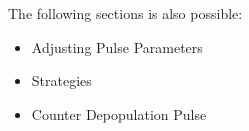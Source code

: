 The following sections is also possible:
\begin{itemize}
    \item Adjusting Pulse Parameters
    \item Strategies
    \item Counter Depopulation Pulse
\end{itemize}



